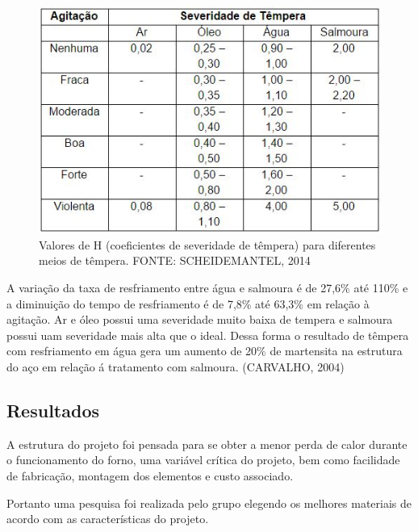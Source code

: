 \begin{figure}[H]
	\centering
	\label{tab_valoresH}
	\includegraphics[keepaspectratio=true,scale=0.8]{figuras/tab_valoresH.JPG}
	\caption{Valores de H (coeficientes de severidade de têmpera) para diferentes meios de têmpera. FONTE: SCHEIDEMANTEL, 2014}
\end{figure}

A variação da taxa de resfriamento entre água e salmoura é de 27,6\% até 110\% e a diminuição do tempo de resfriamento é de 7,8\% até 63,3\% em relação à agitação. Ar e óleo possui uma severidade muito baixa de tempera e salmoura possui uam severidade mais alta que o ideal. Dessa forma o resultado de têmpera com resfriamento em água gera um aumento de 20\% de martensita na estrutura do aço em relação á tratamento com salmoura. (CARVALHO, 2004)

\subsection{Resultados}
A estrutura do projeto foi pensada para se obter a menor perda de calor durante o funcionamento do forno, uma variável crítica do projeto, bem como facilidade de fabricação, montagem dos elementos e custo associado.

Portanto uma pesquisa foi realizada pelo grupo elegendo os melhores materiais de acordo com as características do projeto.

